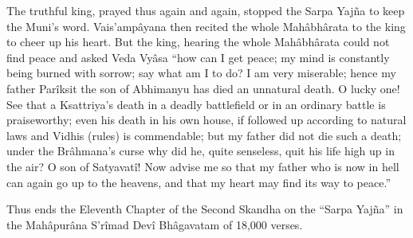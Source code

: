The truthful king, prayed thus again and again, stopped the Sarpa Yajña to keep the Muni's word. Vais'ampâyana then recited the whole Mahâbhârata to the king to cheer up his heart. But the king, hearing the whole Mahâbhârata could not find peace and asked Veda Vyâsa “how can I get peace; my mind is constantly being burned with sorrow; say what am I to do? I am very miserable; hence my father Parîksit the son of Abhimanyu has died an unnatural death. O lucky one! See that a Ksattriya's death in a deadly battlefield or in an ordinary battle is praiseworthy; even his death in his own house, if followed up according to natural laws and Vidhis (rules) is commendable; but my father did not die such a death; under the Brâhmana's curse why did he, quite senseless, quit his life high up in the air? O son of Satyavatî! Now advise me so that my father who is now in hell can again go up to the heavens, and that my heart may find its way to peace.”

 

Thus ends the Eleventh Chapter of the Second Skandha on the “Sarpa Yajña” in the Mahâpurâna S’rîmad Devî Bhâgavatam of 18,000 verses.